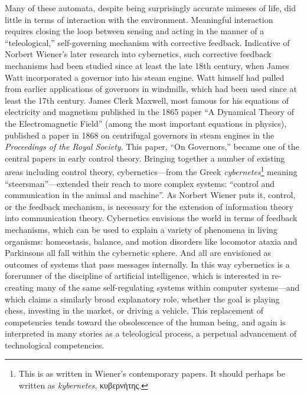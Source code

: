 Many of these automata, despite being surprisingly accurate
mimeses of life, did little in terms of interaction with the
environment. Meaningful interaction requires closing the loop between
sensing and acting in the manner of a
 ``teleological,'' self-governing mechanism with corrective feedback.
 Indicative of Norbert Wiener's later research into cybernetics, such
 corrective feedback mechanisms had been studied since at least the
 late 18th century, when James Watt incorporated a governor into his
 steam engine. Watt himself had pulled from earlier applications of
 governors in windmills, which had been used since at least the 17th
 century.\cite{richardhills} James Clerk Maxwell, most famous for his equations of
 electricity and magnetism published in the 1865 paper ``A Dynamical
 Theory of the Electromagnetic Field'' (among the most important
 equations in physics), published a paper in 1868 on centrifugal
 governors in steam engines in the \emph{Proceedings of the Royal Society}. This
 paper, ``On Governors,'' became one of the central papers in early
 control theory.\cite{ottomayr} Bringing together a number of existing
 areas including control theory,
 cybernetics---from the Greek \emph{cybernetes}\footnote{This is as
   written in Wiener's contemporary papers. It should perhaps be written
   as \emph{kybernetes}, κυβερνήτης.} meaning
 ``steersman''\cite[p. 6]{wienerMainIdeas}---extended their reach to more complex
 systems: ``control and communication in the animal and machine''. As
 Norbert Wiener puts it, control, or the
 feedback mechanism, is necessary for the extension of information
 theory into communication theory. Cybernetics envisions the world in
 terms of feedback mechanisms, which can be used to explain a variety
 of phenomena in living organisms: homeostasis, balance, and motion
 disorders like locomotor ataxia and Parkinsons all fall within the
 cybernetic sphere\cite[p. 10-15]{wienerMainIdeas}. And all are envisioned
 as outcomes of systems that pass messages internally. In this way
 cybernetics is a forerunner of the discipline of
 artificial intelligence, which is interested in re-creating many of the same
 self-regulating systems within computer systems---and which claims a
 similarly broad explanatory role, whether the goal is playing chess,
 investing in the market, or driving a vehicle. This replacement of
 competencies tends toward the obsolescence of the human being, and
 again is interpreted in many stories as a teleological process, a
 perpetual advancement of technological competencies.

